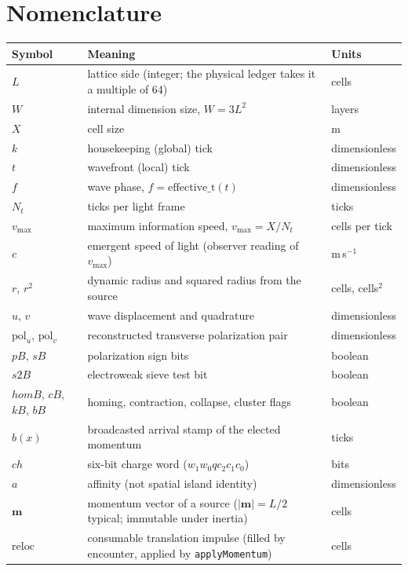 \documentclass[a4paper]{article}
\renewcommand{\arraystretch}{1.5}
\begin{document}
\section*{Nomenclature}
\begin{center}
\renewcommand{\arraystretch}{1.25}
\begin{tabular}{@{}p{2.8cm}p{9.2cm}p{2.8cm}@{}}
\hline
\textbf{Symbol} & \textbf{Meaning} & \textbf{Units}\\
\hline
$L$ & lattice side (integer; the physical ledger takes it a multiple of 64) & cells\\
$W$ & internal dimension size, $W=3L^{2}$ & layers\\
$X$ & cell size & m\\
$k$ & housekeeping (global) tick & dimensionless\\
$t$ & wavefront (local) tick & dimensionless\\
$f$ & wave phase, $f=\mathrm{effective\_t}(t)$ & dimensionless\\
$N_t$ & ticks per light frame & ticks\\
$v_{\max}$ & maximum information speed, $v_{\max}=X/N_t$ & cells per tick\\
$c$ & emergent speed of light (observer reading of $v_{\max}$) & m\,s$^{-1}$\\
$r$, $r^{2}$ & dynamic radius and squared radius from the source & cells, cells$^{2}$\\
$u$, $v$ & wave displacement and quadrature & dimensionless\\
$\mathrm{pol}_u$, $\mathrm{pol}_v$ & reconstructed transverse polarization pair & dimensionless\\
$pB$, $sB$ & polarization sign bits & boolean\\
$s2B$ & electroweak sieve test bit & boolean\\
$homB$, $cB$, $kB$, $bB$ & homing, contraction, collapse, cluster flags & boolean\\
$b(x)$ & broadcasted arrival stamp of the elected momentum & ticks\\
$ch$ & six-bit charge word ($w_1 w_0 q c_2 c_1 c_0$) & bits\\
$a$ & affinity (not spatial island identity) & dimensionless\\
$\boldsymbol{m}$ & momentum vector of a source ($\lvert\boldsymbol{m}\rvert=L/2$ typical; immutable under inertia) & cells\\
$\mathrm{reloc}$ & consumable translation impulse (filled by encounter, applied by \texttt{applyMomentum}) & cells\\

\end{tabular}
\end{center}
\end{document}
